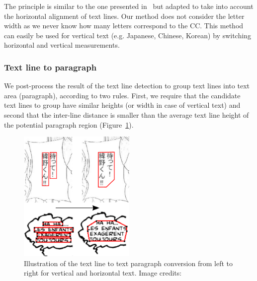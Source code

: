  The principle is similar to the one presented in~\cite{Clavelli09} but adapted to take into account the horizontal alignment of text lines.
 Our method does not consider the letter width as we never know how many letters correspond to the CC.
 This method can easily be used for vertical text (e.g. Japanese, Chinese, Korean) by switching horizontal and vertical measurements.







\subsubsection{Text line to paragraph} %
\label{par:text_line_grouping}

We post-process the result of the text line detection to group text lines into text area (paragraph), according to two rules.
First, we require that the candidate text lines to group have similar heights (or width in case of vertical text) and second that the inter-line distance is smaller than the average text line height of the potential paragraph region (Figure~\ref{fig:se:line_to_paragraphs}).

	\begin{figure}[h!]	%
	  \centering
		\includegraphics[trim= 0px 0px 0px 0px, clip, width=0.5\textwidth]{line_to_paragraphs.pdf}
		\caption[Text line to text paragraph conversion illustration]{Illustration of the text line to text paragraph conversion from left to right for vertical and horizontal text. Image credits:~\cite{Inoue08,Bubble09}}
		\label{fig:se:line_to_paragraphs}
	\end{figure}

